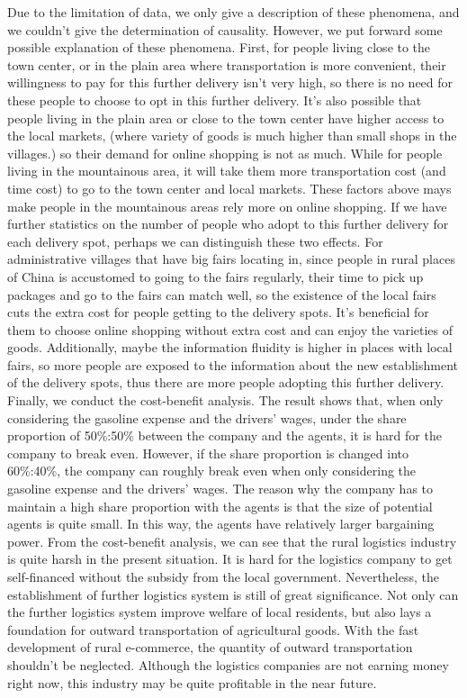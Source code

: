 \documentclass{article}
\begin{document}
Due to the limitation of data, we only give a description of these phenomena, and we couldn’t give the determination of causality. However, we put forward some possible explanation of these phenomena. First, for people living close to the town center, or in the plain area where transportation is more convenient, their willingness to pay for this further delivery isn’t very high, so there is no need for these people to choose to opt in this further delivery. It’s also possible that people living in the plain area or close to the town center have higher access to the local markets, (where variety of goods is much higher than small shops in the villages.) so their demand for online shopping is not as much. While for people living in the mountainous area, it will take them more transportation cost (and time cost) to go to the town center and local markets. These factors above mays make people in the mountainous areas rely more on online shopping. If we have further statistics on the number of people who adopt to this further delivery for each delivery spot, perhaps we can distinguish these two effects. For administrative villages that have big fairs locating in, since people in rural places of China is accustomed to going to the fairs regularly, their time to pick up packages and go to the fairs can match well, so the existence of the local fairs cuts the extra cost for people getting to the delivery spots. It’s beneficial for them to choose online shopping without extra cost and can enjoy the varieties of goods. Additionally, maybe the information fluidity is higher in places with local fairs, so more people are exposed to the information about the new establishment of the delivery spots, thus there are more people adopting this further delivery.\\
\mbox{\hspace{2em}}
Finally, we conduct the cost-benefit analysis. The result shows that, when only considering the gasoline expense and the drivers’ wages, under the share proportion of 50\%:50\% between the company and the agents, it is hard for the company to break even. However, if the share proportion is changed into 60\%:40\%, the company can roughly break even when only considering the gasoline expense and the drivers’ wages. The reason why the company has to maintain a high share proportion with the agents is that the size of potential agents is quite small. In this way, the agents have relatively larger bargaining power. From the cost-benefit analysis, we can see that the rural logistics industry is quite harsh in the present situation. It is hard for the logistics company to get self-financed without the subsidy from the local government. Nevertheless, the establishment of further logistics system is still of great significance. Not only can the further logistics system improve welfare of local residents, but also lays a foundation for outward transportation of agricultural goods. With the fast development of rural e-commerce, the quantity of outward transportation shouldn’t be neglected. Although the logistics companies are not earning money right now, this industry may be quite profitable in the near future.\\
\end{document}
